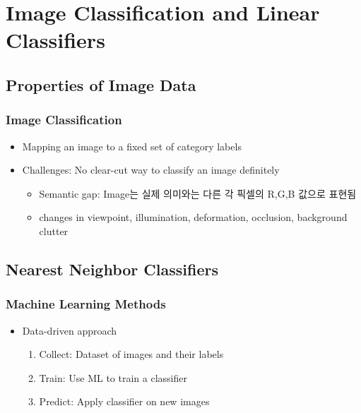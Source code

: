 \section{Image Classification and Linear Classifiers}

\subsection{Properties of Image Data}

\subsubsection*{Image Classification}
\begin{itemize}
    \item Mapping an image to a fixed set of category labels
    \item Challenges: No clear-cut way to classify an image definitely
    \begin{itemize}
        \item Semantic gap: Image는 실제 의미와는 다른 각 픽셀의 R,G,B 값으로 표현됨
        \item changes in viewpoint, illumination, deformation, occlusion, background clutter
    \end{itemize}
\end{itemize}
\begin{figures}
\end{figures}

\subsection{Nearest Neighbor Classifiers}

\subsubsection*{Machine Learning Methods}
\begin{itemize}
    \item Data-driven approach
    \begin{enumerate}
        \item Collect: Dataset of images and their labels
        \item Train: Use ML to train a classifier
        \item Predict: Apply classifier on new images
    \end{enumerate}
\end{itemize}

